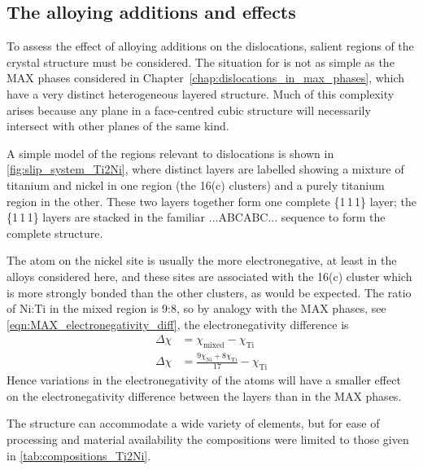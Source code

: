 \subsection{The alloying additions and effects}

To assess the effect of alloying additions on the dislocations, salient regions of the crystal structure must be considered. The situation for  is not as simple as the MAX phases considered in Chapter~\ref{chap:dislocations_in_max_phases}, which have a very distinct heterogeneous layered structure. Much of this complexity arises because any plane in a face-centred cubic structure will necessarily intersect with other planes of the same kind.

A simple model of the regions relevant to dislocations is shown in \autoref{fig:slip_system_Ti2Ni}, where distinct layers are labelled showing a mixture of titanium and nickel in one region (the 16(c) clusters) and a purely titanium region in the other. These two layers together form one complete \{1\,1\,1\} layer; the \{1\,1\,1\} layers are stacked in the familiar ...ABCABC... sequence to form the complete structure.

The atom on the nickel site is usually the more electronegative, at least in the alloys considered here, and these sites are associated with the 16(c) cluster which is more strongly bonded than the other clusters, as would be expected. The ratio of Ni:Ti in the mixed region is 9:8, so by analogy with the MAX phases, see \autoref{eqn:MAX_electronegativity_diff}, the electronegativity difference is
\begin{align}
\Delta \chi &= \chi_{\text{mixed}} - \chi_{\text{Ti}} \nonumber\\
\Delta \chi &= \frac{9\chi_{\text{Ni}} + 8\chi_{\text{Ti}}}{17} - \chi_{\text{Ti}}
\end{align}
Hence variations in the electronegativity of the atoms will have a smaller  effect on the electronegativity difference between the layers than in the MAX phases.

The  structure can accommodate a wide variety of elements, but for ease of processing and material availability the compositions were limited to those given in \autoref{tab:compositions_Ti2Ni}. 

